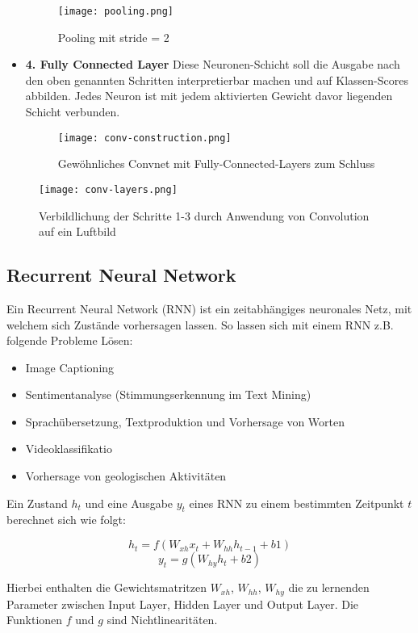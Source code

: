 \documentclass[11pt,fleqn]{book}
\begin{document}
\begin{itemize}
\begin{figure}[h]
\centering
\texttt{[image: pooling.png]}
\caption{Pooling mit stride = 2}
\end{figure}

\item \textbf{4. Fully Connected Layer} Diese Neuronen-Schicht soll die Ausgabe nach den oben genannten Schritten interpretierbar machen und auf Klassen-Scores abbilden. Jedes Neuron ist mit jedem aktivierten Gewicht davor liegenden Schicht verbunden.
\begin{figure}[h]
\centering
\texttt{[image: conv-construction.png]}
\caption{Gewöhnliches Convnet mit Fully-Connected-Layers zum Schluss}
\end{figure}

\end{itemize}

\begin{figure}[h]
\centering
\texttt{[image: conv-layers.png]}
\caption{Verbildlichung der Schritte 1-3 durch Anwendung von Convolution auf ein Luftbild\protect\footnotemark}
\end{figure}


\subsection{Recurrent Neural Network}
Ein Recurrent Neural Network (RNN) ist ein zeitabhängiges neuronales Netz, mit welchem sich Zustände vorhersagen lassen. So lassen sich mit einem RNN z.B. folgende Probleme Lösen:

\begin{itemize}
\item Image Captioning
\item Sentimentanalyse (Stimmungserkennung im Text Mining)
\item Sprachübersetzung, Textproduktion und Vorhersage von Worten
\item Videoklassifikatio
\item Vorhersage von geologischen Aktivitäten
\end{itemize}

Ein Zustand $h_t$ und eine Ausgabe $y_t$ eines RNN zu einem bestimmten Zeitpunkt $t$ berechnet sich wie folgt:

\[h_t = f(W_{xh} x_t + W_{hh} h_{t-1} + b1)\]
\[y_t = g(W_{hy} h_t + b2)\]

Hierbei enthalten die Gewichtsmatritzen $W_{xh}$, $W_{hh}$, $W_{hy}$ die zu lernenden Parameter zwischen Input Layer, Hidden Layer und Output Layer. Die Funktionen $f$ und $g$ sind Nichtlinearitäten.
\end{document}
